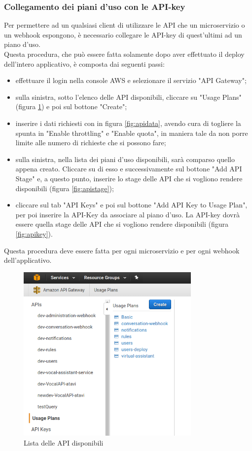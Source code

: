\subsubsection{Collegamento dei piani d'uso con le API-key}\label{pianoduso}
Per permettere ad un qualsiasi client di utilizzare le API che un microservizio o un webhook espongono, è necessario collegare le API-key di quest'ultimi ad un piano d'uso.\\
Questa procedura, che può essere fatta solamente dopo aver effettuato il deploy dell'intero applicativo, è composta dai seguenti passi:
\begin{itemize}
	\item effettuare il login nella console AWS e selezionare il servizio "API Gateway";
	\item sulla sinistra, sotto l'elenco delle API disponibili, cliccare su "Usage Plans" (figura \ref{fig:api}) e poi sul bottone "Create";
	\item inserire i dati richiesti con in figura \ref{fig:apidata}, avendo cura di togliere la spunta in "Enable throttling" e "Enable quota", in maniera tale da non porre limite alle numero di richieste che si possono fare;
	\item sulla sinistra, nella lista dei piani d'uso disponibili, sarà comparso quello appena creato. Cliccare su di esso e successivamente sul bottone "Add API Stage" e, a questo punto, inserire lo stage delle API che si vogliono rendere disponibili (figura \ref{fig:apistage});
	\item cliccare sul tab "API Keys" e poi sul bottone "Add API Key to Usage Plan", per poi inserire la API-Key da associare al piano d'uso. La API-key dovrà essere quella stage delle API che si vogliono rendere disponibili (figura \ref{fig:apikey}). 
\end{itemize}
Questa procedura deve essere fatta per ogni microservizio e per ogni webhook dell'applicativo.
\begin{figure}[H]
	\centerline{\includegraphics[width=0.8\textwidth,height=\textheight,keepaspectratio]{sezioni/images/Api.png}}
	\caption{Lista delle API disponibili}\label{fig:api}
\end{figure}
